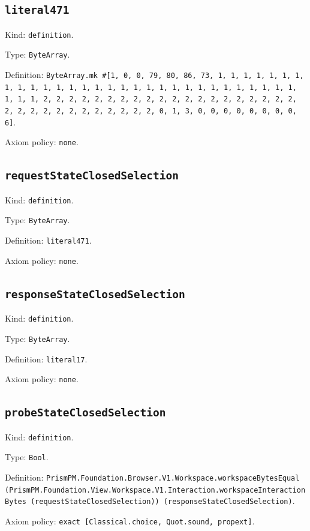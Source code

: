 \documentclass[11pt]{article}
\begin{document}
\subsection*{\texttt{literal471}}
\noindent Kind: \texttt{definition}.\par
\noindent Type: \texttt{ByteArray}.\par
\noindent Definition: \texttt{ByteArray.mk \#[1, 0, 0, 79, 80, 86, 73, 1, 1, 1, 1, 1, 1, 1, 1, 1, 1, 1, 1, 1, 1, 1, 1, 1, 1, 1, 1, 1, 1, 1, 1, 1, 1, 1, 1, 1, 1, 1, 1, 1, 2, 2, 2, 2, 2, 2, 2, 2, 2, 2, 2, 2, 2, 2, 2, 2, 2, 2, 2, 2, 2, 2, 2, 2, 2, 2, 2, 2, 2, 2, 2, 2, 0, 1, 3, 0, 0, 0, 0, 0, 0, 0, 0, 6]}.\par
\noindent Axiom policy: \texttt{none}.\par
\subsection*{\texttt{requestStateClosedSelection}}
\noindent Kind: \texttt{definition}.\par
\noindent Type: \texttt{ByteArray}.\par
\noindent Definition: \texttt{literal471}.\par
\noindent Axiom policy: \texttt{none}.\par
\subsection*{\texttt{responseStateClosedSelection}}
\noindent Kind: \texttt{definition}.\par
\noindent Type: \texttt{ByteArray}.\par
\noindent Definition: \texttt{literal17}.\par
\noindent Axiom policy: \texttt{none}.\par
\subsection*{\texttt{probeStateClosedSelection}}
\noindent Kind: \texttt{definition}.\par
\noindent Type: \texttt{Bool}.\par
\noindent Definition: \texttt{PrismPM.Foundation.Browser.V1.Workspace.workspaceBytesEqual (PrismPM.Foundation.View.Workspace.V1.Interaction.workspaceInteractionBytes (requestStateClosedSelection)) (responseStateClosedSelection)}.\par
\noindent Axiom policy: \texttt{exact [Classical.choice, Quot.sound, propext]}.\par
\end{document}
